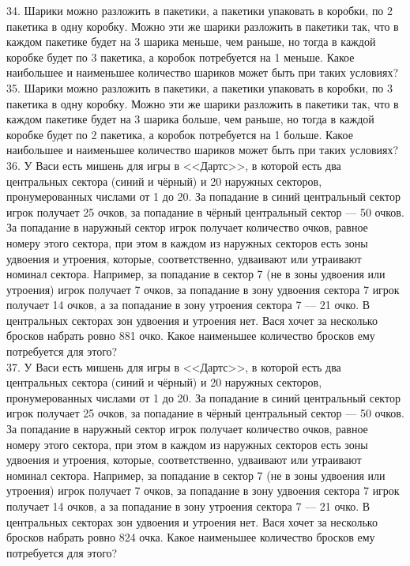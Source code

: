 \documentclass[12pt]{article}
\begin{document}
34. Шарики можно разложить в пакетики, а пакетики упаковать в коробки, по 2 пакетика в одну коробку. Можно эти же шарики разложить в пакетики так, что в каждом пакетике будет на 3 шарика меньше, чем раньше, но тогда в каждой коробке будет по 3 пакетика, а коробок потребуется на 1 меньше. Какое наибольшее и наименьшее количество шариков может быть при таких условиях?\\
35. Шарики можно разложить в пакетики, а пакетики упаковать в коробки, по 3 пакетика в одну коробку. Можно эти же шарики разложить в пакетики так, что в каждом пакетике будет на 3 шарика больше, чем раньше, но тогда в каждой коробке будет по 2 пакетика, а коробок потребуется на 1 больше. Какое наибольшее и наименьшее количество шариков может быть при таких условиях?\\
36. У Васи есть мишень для игры в <<Дартс>>, в которой есть два центральных сектора (синий и чёрный) и 20 наружных секторов, пронумерованных числами от 1 до 20. За попадание в синий центральный сектор игрок получает 25 очков, за попадание в чёрный центральный сектор --- 50 очков. За попадание в наружный сектор игрок получает количество очков, равное номеру этого сектора, при этом в каждом из наружных секторов есть зоны удвоения и утроения, которые, соответственно, удваивают или утраивают номинал сектора. Например, за попадание в сектор 7 (не в зоны удвоения или утроения) игрок получает 7 очков, за попадание в зону удвоения сектора 7 игрок получает 14 очков, а за попадание в зону утроения сектора 7 --- 21 очко. В центральных секторах зон удвоения и утроения нет. Вася хочет за несколько бросков набрать ровно 881 очко. Какое наименьшее количество бросков ему потребуется для этого?\\
37. У Васи есть мишень для игры в <<Дартс>>, в которой есть два центральных сектора (синий и чёрный) и 20 наружных секторов, пронумерованных числами от 1 до 20. За попадание в синий центральный сектор игрок получает 25 очков, за попадание в чёрный центральный сектор --- 50 очков. За попадание в наружный сектор игрок получает количество очков, равное номеру этого сектора, при этом в каждом из наружных секторов есть зоны удвоения и утроения, которые, соответственно, удваивают или утраивают номинал сектора. Например, за попадание в сектор 7 (не в зоны удвоения или утроения) игрок получает 7 очков, за попадание в зону удвоения сектора 7 игрок получает 14 очков, а за попадание в зону утроения сектора 7 --- 21 очко. В центральных секторах зон удвоения и утроения нет. Вася хочет за несколько бросков набрать ровно 824 очка. Какое наименьшее количество бросков ему потребуется для этого?\\
\end{document}
